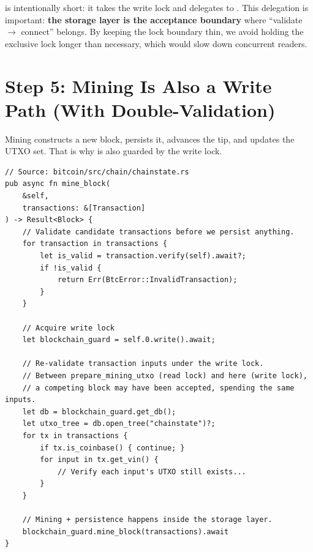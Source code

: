 \begin{notebox}
 is intentionally short: it takes the write lock and delegates to . This delegation is important: \textbf{the storage layer is the acceptance boundary} where ``validate \(\to\) connect'' belongs. By keeping the lock boundary thin, we avoid holding the exclusive lock longer than necessary, which would slow down concurrent readers.
\end{notebox}

\section{Step 5: Mining Is Also a Write Path (With Double-Validation)}
\label{sec:ch09-2-step5}

Mining constructs a new block, persists it, advances the tip, and updates the UTXO set. That is why  is also guarded by the write lock.

\begin{listing}[htbp]
\caption{Mining boundary ()}
\label{lst:ch09-2-5}
\begin{verbatim}
// Source: bitcoin/src/chain/chainstate.rs
pub async fn mine_block(
    &self,
    transactions: &[Transaction]
) -> Result<Block> {
    // Validate candidate transactions before we persist anything.
    for transaction in transactions {
        let is_valid = transaction.verify(self).await?;
        if !is_valid {
            return Err(BtcError::InvalidTransaction);
        }
    }

    // Acquire write lock
    let blockchain_guard = self.0.write().await;

    // Re-validate transaction inputs under the write lock.
    // Between prepare_mining_utxo (read lock) and here (write lock),
    // a competing block may have been accepted, spending the same inputs.
    let db = blockchain_guard.get_db();
    let utxo_tree = db.open_tree("chainstate")?;
    for tx in transactions {
        if tx.is_coinbase() { continue; }
        for input in tx.get_vin() {
            // Verify each input's UTXO still exists...
        }
    }

    // Mining + persistence happens inside the storage layer.
    blockchain_guard.mine_block(transactions).await
}
\end{verbatim}
\end{listing}

